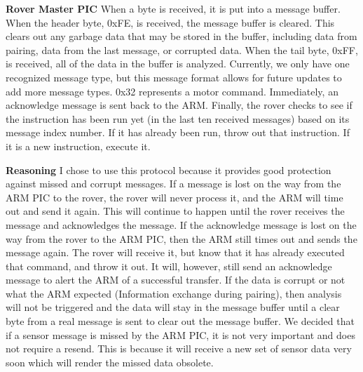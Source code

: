 {\textbf{Rover Master PIC}
When a byte is received, it is put into a message buffer. When the header byte, 0xFE, is received, the message buffer is cleared. This clears out any garbage data that may be stored in the buffer, including data from pairing, data from the last message, or corrupted data. When the tail byte, 0xFF, is received, all of the data in the buffer is analyzed.
Currently, we only have one recognized message type, but this message format allows for future updates to add more message types. 0x32 represents a motor command. Immediately, an acknowledge message is sent back to the ARM.
Finally, the rover checks to see if the instruction has been run yet (in the last ten received messages) based on its message index number. If it has already been run, throw out that instruction. If it is a new instruction, execute it.

\textbf{Reasoning}
I chose to use this protocol because it provides good protection against missed and corrupt messages.
If a message is lost on the way from the ARM PIC to the rover, the rover will never process it, and the ARM will time out and send it again. This will continue to happen until the rover receives the message and acknowledges the message.
If the acknowledge message is lost on the way from the rover to the ARM PIC, then the ARM still times out and sends the message again. The rover will receive it, but know that it has already executed that command, and throw it out. It will, however, still send an acknowledge message to alert the ARM of a successful transfer.
If the data is corrupt or not what the ARM expected (Information exchange during pairing), then analysis will not be triggered and the data will stay in the message buffer until a clear byte from a real message is sent to clear out the message buffer.
We decided that if a sensor message is missed by the ARM PIC, it is not very important and does not require a resend. This is because it will receive a new set of sensor data very soon which will render the missed data obsolete.
 

}
